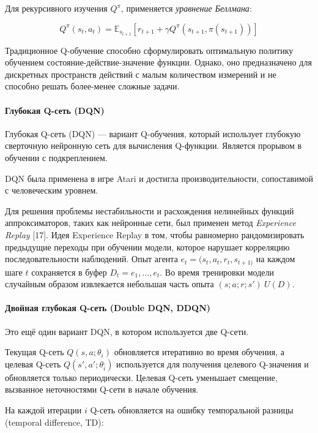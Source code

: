 Для рекурсивного изучения $Q^\pi$, применяется {\itshape уравнение Беллмана}:

\begin{equation} \label{eq:q-learning-bellmanEq}
Q^\pi(s_t, a_t) = \mathbb{E}_{s_{t+1}}[r_{t+1} + \gamma Q^\pi (s_{t+1}, \pi(s_{t+1}))]
\end{equation}

Традиционное Q-обучение способно сформулировать оптимальную политику обучением состояние-действие-значение функции. Однако, оно предназначено для дискретных пространств действий с малым количеством измерений и не способно решать более-менее сложные задачи.

\paragraph{Глубокая Q-сеть (DQN)}

Глубокая Q-сеть (DQN) --- вариант Q-обучения, который использует глубокую сверточную нейронную сеть для вычисления Q-функции. Является прорывом в обучении с подкреплением. \cite{bertsekas1996neuro}

DQN была применена в игре Atari и достигла производительности, сопоставимой с человеческим уровнем. \cite{Mnih2015}

Для решения проблемы нестабильности и расхождения нелинейных функций аппроксиматоров, таких как нейронные сети, был применен метод {\itshape Experience Replay} [17]. Идея Experience Replay в том, чтобы равномерно рандомизировать предыдущие переходы при обучении модели, которое нарушает корреляцию последовательности наблюдений. Опыт агента $e_t = (s_t, a_t, r_t, s_{t+1)}$ на каждом шаге $t$ сохраняется в буфер $D_t = {e_1, ..., e_t}$. Во время тренировки модели случайным образом извлекается небольшая часть опыта $(s; a; r; s') ~ U(D)$.

\paragraph{Двойная глубокая Q-сеть (Double DQN, DDQN)}

Это ещё один вариант DQN, в котором используется две Q-сети.

Текущая Q-сеть $Q(s, a; \theta_i)$ обновляется итеративно во время обучения, а целевая Q-сеть $Q(s', a'; \theta_i^\_)$ используется для получения целевого Q-значения и обновляется только периодически. Целевая Q-сеть уменьшает смещение, вызванное неточностями Q-сети в начале обучения.

На каждой итерации $i$ Q-сеть обновляется на ошибку темпоральной разницы (temporal difference, TD):

